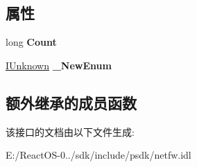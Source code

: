 \subsection*{属性}
\begin{DoxyCompactItemize}
\item 
\mbox{\label{interface_i_net_fw_open_ports_a894eb7492786d273dc320a1577a5378f}} 
long {\bfseries Count}
\item 
\mbox{\label{interface_i_net_fw_open_ports_a59c990957dc50a9d2201983f6e74b45f}} 
\hyperlink{interface_i_unknown}{I\+Unknown} {\bfseries \+\_\+\+New\+Enum}
\end{DoxyCompactItemize}
\subsection*{额外继承的成员函数}


该接口的文档由以下文件生成\+:\begin{DoxyCompactItemize}
\item 
E\+:/\+React\+O\+S-\/0../sdk/include/psdk/netfw.\+idl\end{DoxyCompactItemize}
